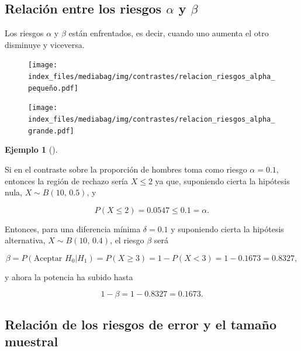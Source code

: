 \documentclass[
  a4paper,
]{scrreport}
\theoremstyle{definition}
\theoremstyle{definition}
\newtheorem{example}{Ejemplo}[chapter]
\theoremstyle{plain}
\theoremstyle{remark}
\begin{document}
\hypertarget{relaciuxf3n-entre-los-riesgos-alpha-y-beta}{%
\subsection{\texorpdfstring{Relación entre los riesgos \(\alpha\) y
\(\beta\)}{Relación entre los riesgos \textbackslash alpha y \textbackslash beta}}\label{relaciuxf3n-entre-los-riesgos-alpha-y-beta}}

Los riesgos \(\alpha\) y \(\beta\) están enfrentados, es decir, cuando
uno aumenta el otro disminuye y viceversa.

\begin{figure}

{\centering \texttt{[image: index\_files/mediabag/img/contrastes/relacion\_riesgos\_alpha\_pequeño.pdf]}

}

\end{figure}

\begin{figure}

{\centering \texttt{[image: index\_files/mediabag/img/contrastes/relacion\_riesgos\_alpha\_grande.pdf]}

}

\end{figure}

\begin{example}[]\protect\hypertarget{exm-relacion-riesgos-alfa-beta}{}\label{exm-relacion-riesgos-alfa-beta}

Si en el contraste sobre la proporción de hombres toma como riesgo
\(\alpha=0.1,\) entonces la región de rechazo sería \(X\leq 2\) ya que,
suponiendo cierta la hipótesis nula, \(X\sim B(10,\, 0.5)\), y

\[P(X\leq 2) = 0.0547 \leq 0.1=\alpha.\]

Entonces, para una diferencia mínima \(\delta=0.1\) y suponiendo cierta
la hipótesis alternativa, \(X\sim B(10,\,0.4)\), el riesgo \(\beta\)
será

\[\beta = P(\mbox{Aceptar }H_0|H_1) = P(X\geq 3) = 1- P(X<3) = 1-0.1673 = 0.8327,\]

y ahora la potencia ha subido hasta

\[1-\beta = 1-0.8327 = 0.1673.\]

\end{example}

\hypertarget{relaciuxf3n-de-los-riesgos-de-error-y-el-tamauxf1o-muestral}{%
\subsection{Relación de los riesgos de error y el tamaño
muestral}\label{relaciuxf3n-de-los-riesgos-de-error-y-el-tamauxf1o-muestral}}
\end{document}
